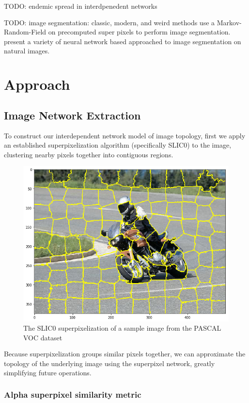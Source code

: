\documentclass[twocolumn]{article}
\newcommand{\todo}[1]{}
\renewcommand{\todo}[1]{{\color{red} TODO: {#1}}}
\newcommand{\seclab}[1]{\label{sec:#1}}
\begin{document}
\todo{endemic spread in interdpenedent networks}

\todo{image segmentation: classic, modern, and weird methods}
\cite{pei2014saliency} use a Markov-Random-Field on precomputed super pixels to
perform image segmentation.  \cite{newell2017associative,li2017fully,ren2017end}
present a variety of neural network based approached to image segmentation on
natural images.

\section{Approach}\seclab{approach}

\subsection{Image Network Extraction}

To construct our interdependent network model of image topology, first we apply an established superpixelization algorithm (specifically SLIC0) to the image, clustering nearby pixels together into contiguous regions.

\begin{figure}[h]
  \centering
  \includegraphics[width=0.8\linewidth]{figs/superpixels.png}
  \caption{
    The SLIC0 superpixelization of a sample image from the PASCAL VOC dataset
  }
\end{figure}

Because superpixelization groups similar pixels together, we can approximate the topology of the underlying image using the superpixel network, greatly simplifying future operations.

\subsubsection{Alpha superpixel similarity metric}
\end{document}
